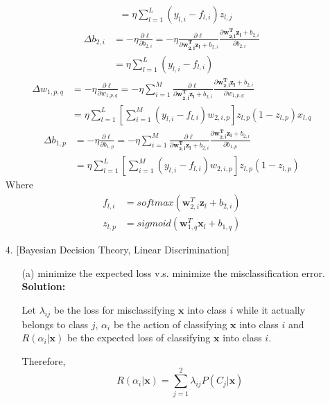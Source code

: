 \documentclass{article}
\renewcommand{\b}[1]{\bm{#1}}
\begin{document}
\begin{enumerate}
\begin{align*}
        &= \eta\sum_{l=1}^L(y_{l,i}-f_{l,i})z_{l,j}
    \end{align*}
    \begin{align*}
        \Delta b_{2,i}
        &= -\eta\frac{\partial \ell}{\partial b_{2,i}} 
        = -\eta\frac{\partial \ell}{\partial \b{w_{2,i}^Tz_l}+b_{2,i}}\frac{\partial \b{w_{2,i}^Tz_l}+b_{2,i}}{\partial b_{2,i}}\\
        &= \eta\sum_{l=1}^L(y_{l,i}-f_{l,i})
    \end{align*}
    \begin{align*}
        \Delta w_{1,p,q}
        &=-\eta\frac{\partial \ell}{\partial w_{1,p,q}}
        = -\eta\sum_{i=1}^M\frac{\partial \ell}{\partial \b{w_{2,i}^Tz_l}+b_{2,i}}\frac{\partial \b{w_{2,i}^Tz_l}+b_{2,i}}{\partial w_{1,p,q}}\\
        &= \eta\sum_{l=1}^L\left[\sum_{i=1}^M(y_{l,i}-f_{l,i})w_{2,i,p}\right]z_{l,p}(1-z_{l,p})x_{l,q}
    \end{align*}
    \begin{align*}
        \Delta b_{1,p}
        &=-\eta\frac{\partial \ell}{\partial b_{1,p}}
        = -\eta\sum_{i=1}^M\frac{\partial \ell}{\partial \b{w_{2,i}^Tz_l}+b_{2,i}}\frac{\partial \b{w_{2,i}^Tz_l}+b_{2,i}}{\partial b_{1,p}}\\
        &= \eta\sum_{l=1}^L\left[\sum_{i=1}^M(y_{l,i}-f_{l,i})w_{2,i,p}\right]z_{l,p}(1-z_{l,p})
    \end{align*}
    Where 
    \begin{align*}
        f_{l,i} &= softmax(\b{w}_{2,i}^T\b{z}_l+b_{2,i})\\
        z_{l,p} &= sigmoid(\b{w}_{1,q}^T\b{x}_l+b_{1,q})
    \end{align*}
    \item [4.] [Bayesian Decision Theory, Linear Discrimination]
    \begin{enumerate}
        \setlength\parindent{2em}
        \item [(a)]minimize the expected loss v.s. minimize the misclassification error.\newline
        {\bf Solution:}
        \par Let $\lambda_{ij}$ be the loss for misclassifying $\b{x}$ into class $i$ while it actually belongs to class $j$, $\alpha_i$ be the action of classifying $\b{x}$ into class $i$ and $R(\alpha_i|\b{x})$ be the expected loss of classifying $\b{x}$ into class $i$.
        \par Therefore, 
        \[R(\alpha_i|\b{x})=\sum_{j=1}^2\lambda_{ij}P(C_j|\b{x})\]

\end{enumerate}
\end{enumerate}
\end{document}
